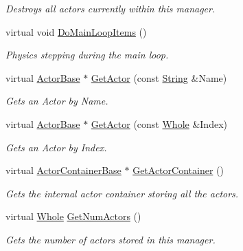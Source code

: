 \begin{DoxyCompactItemize}
\begin{DoxyCompactList}\small\item\em Destroys all actors currently within this manager. \item\end{DoxyCompactList}\item 
virtual void \hyperlink{classphys_1_1ActorManager_abafe749a5ef6f750c6f3bbf2804c186e}{DoMainLoopItems} ()
\begin{DoxyCompactList}\small\item\em Physics stepping during the main loop. \item\end{DoxyCompactList}\item 
virtual \hyperlink{classphys_1_1ActorBase}{ActorBase} $\ast$ \hyperlink{classphys_1_1ActorManager_a42dc22df8b201f25f41676b303e5bf95}{GetActor} (const \hyperlink{namespacephys_aa03900411993de7fbfec4789bc1d392e}{String} \&Name)
\begin{DoxyCompactList}\small\item\em Gets an Actor by Name. \item\end{DoxyCompactList}\item 
virtual \hyperlink{classphys_1_1ActorBase}{ActorBase} $\ast$ \hyperlink{classphys_1_1ActorManager_ac2700addfdd0d4fc97dc9afe30b3923d}{GetActor} (const \hyperlink{namespacephys_a460f6bc24c8dd347b05e0366ae34f34a}{Whole} \&Index)
\begin{DoxyCompactList}\small\item\em Gets an Actor by Index. \item\end{DoxyCompactList}\item 
virtual \hyperlink{classphys_1_1ActorContainerBase}{ActorContainerBase} $\ast$ \hyperlink{classphys_1_1ActorManager_a7159d9d42e15d9963ee6d0989b1fd74a}{GetActorContainer} ()
\begin{DoxyCompactList}\small\item\em Gets the internal actor container storing all the actors. \item\end{DoxyCompactList}\item 
virtual \hyperlink{namespacephys_a460f6bc24c8dd347b05e0366ae34f34a}{Whole} \hyperlink{classphys_1_1ActorManager_a9ff2ecc8c6b483729ad59a731a737775}{GetNumActors} ()
\begin{DoxyCompactList}\small\item\em Gets the number of actors stored in this manager. \item\end{DoxyCompactList}\item 

\end{DoxyCompactItemize}
